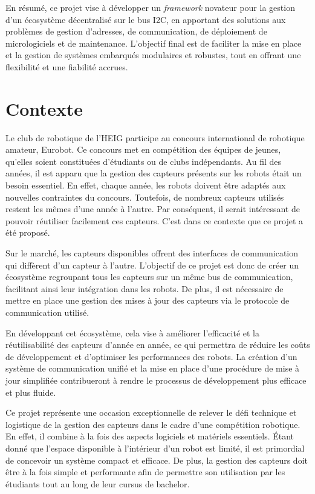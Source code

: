 En résumé, ce projet vise à développer un \textit{\gls{framework}} novateur pour la gestion d'un écosystème décentralisé sur le bus I2C, en apportant des solutions aux problèmes de gestion d'adresses, de communication, de déploiement de micrologiciels et de maintenance.
L'objectif final est de faciliter la mise en place et la gestion de systèmes embarqués modulaires et robustes, tout en offrant une flexibilité et une fiabilité accrues.

\section{Contexte}
Le club de robotique de l'HEIG participe au concours international de robotique amateur, Eurobot.
Ce concours met en compétition des équipes de jeunes, qu'elles soient constituées d'étudiants ou de clubs indépendants.
Au fil des années, il est apparu que la gestion des capteurs présents sur les robots était un besoin essentiel.
En effet, chaque année, les robots doivent être adaptés aux nouvelles contraintes du concours.
Toutefois, de nombreux capteurs utilisés restent les mêmes d'une année à l'autre.
Par conséquent, il serait intéressant de pouvoir réutiliser facilement ces capteurs.
C'est dans ce contexte que ce projet a été proposé.

Sur le marché, les capteurs disponibles offrent des interfaces de communication qui diffèrent d'un capteur à l'autre.
L'objectif de ce projet est donc de créer un écosystème regroupant tous les capteurs sur un même bus de communication, facilitant ainsi leur intégration dans les robots.
De plus, il est nécessaire de mettre en place une gestion des mises à jour des capteurs via le protocole de communication utilisé.

En développant cet écosystème, cela vise à améliorer l'efficacité et la réutilisabilité des capteurs d'année en année, ce qui permettra de réduire les coûts de développement et d'optimiser les performances des robots.
La création d'un système de communication unifié et la mise en place d'une procédure de mise à jour simplifiée contribueront à rendre le processus de développement plus efficace et plus fluide.

Ce projet représente une occasion exceptionnelle de relever le défi technique et logistique de la gestion des capteurs dans le cadre d'une compétition robotique.
En effet, il combine à la fois des aspects logiciels et matériels essentiels.
Étant donné que l'espace disponible à l'intérieur d'un robot est limité, il est primordial de concevoir un système compact et efficace.
De plus, la gestion des capteurs doit être à la fois simple et performante afin de permettre son utilisation par les étudiants tout au long de leur cursus de bachelor.